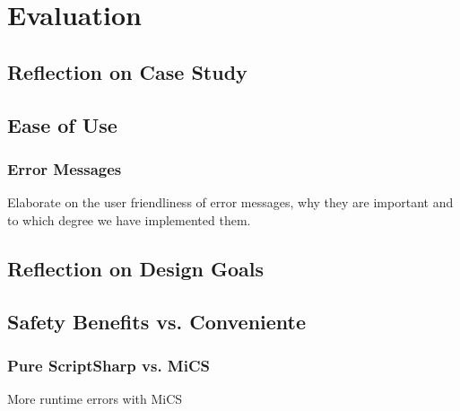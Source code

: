 \chapter{Evaluation}

\section{Reflection on Case Study} %
\label{sec:reflection_on_case_study}


\section{Ease of Use} %
\label{sec:ease_of_use}

	\subsection{Error Messages} %
	\label{sub:error_messages}
		Elaborate on the user friendliness of error messages, why they are important
		and to which degree we have implemented them.	


\section{Reflection on Design Goals} %
\label{sec:reflection_on_design_goals}


\section{Safety Benefits vs. Conveniente} %
\label{sec:safety_benefits_vs_conveniente}

\subsection{Pure ScriptSharp vs. MiCS} %
\label{sub:pure_scriptsharp_vs_mics}
More runtime errors with MiCS


